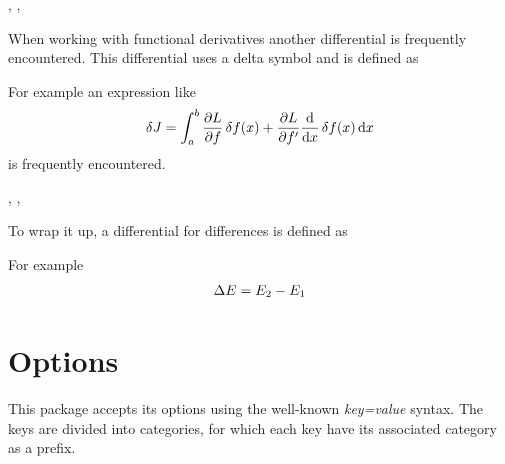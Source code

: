 	\begin{function}{\fdif}
		\begin{syntax}
			\sarg, , 
		\end{syntax}
		When working with functional derivatives another differential is frequently encountered. This differential uses a delta symbol and is defined as
		
		\begin{definition}
			\DeclareDifferential{\fdif}{\delta}
		\end{definition}
		
		\noindent For example an expression like
		\begin{align*}
			\fdif{J} = \int_{a}^{b} \pdv{L}{f} \fdif{f(x)} + \pdv{L}{f'} \odv*{ \fdif{f(x)} }{x} \odif{x}
		\end{align*}
		is frequently encountered.
	\end{function}
	
	\begin{function}{\adif}
		\begin{syntax}
			\sarg, , \marg{variables}
		\end{syntax}
		To wrap it up, a differential for differences is defined as
		
		\begin{definition}
			\DeclareDifferential{\adif}{\Delta}
		\end{definition}
		
		\noindent For example
		\begin{align*}
			\adif{E} = E_2 - E_1
		\end{align*}
	\end{function}
	
	\clearpage
	\section{Options}
	
	This package accepts its options using the well-known \emph{key=value} syntax. The keys are divided into categories, for which each key have its associated category as a prefix.
	
